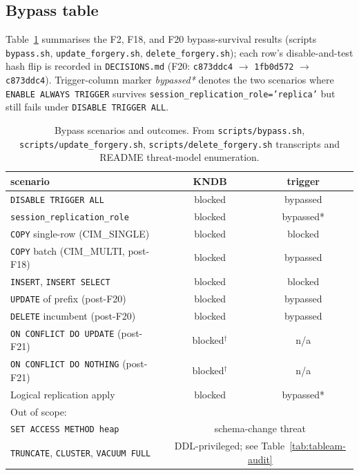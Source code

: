 \documentclass[sigconf, nonacm]{acmart}
\begin{document}
\subsection{Bypass table}
Table~\ref{tab:bypass} summarises the F2, F18, and F20 bypass-survival results (scripts \texttt{bypass.sh}, \texttt{update\_forgery.sh}, \texttt{delete\_forgery.sh}); each row's disable-and-test hash flip is recorded in \texttt{DECISIONS.md} (F20: \texttt{c873ddc4} $\to$ \texttt{1fb0d572} $\to$ \texttt{c873ddc4}). Trigger-column marker \emph{bypassed*} denotes the two scenarios where \texttt{ENABLE ALWAYS TRIGGER} survives \texttt{session\_replication\_role='replica'} but still fails under \texttt{DISABLE TRIGGER ALL}.

\begin{table}[t]
\centering
\caption{Bypass scenarios and outcomes. From \texttt{scripts/bypass.sh}, \texttt{scripts/update\_forgery.sh}, \texttt{scripts/delete\_forgery.sh} transcripts and README threat-model enumeration.}
\label{tab:bypass}
\small
\begin{tabular}{p{4.7cm}cc}
\toprule
scenario & KNDB & trigger \\
\midrule
\texttt{DISABLE TRIGGER ALL}                & blocked & bypassed \\
\texttt{session\_replication\_role}         & blocked & bypassed* \\
\texttt{COPY} single-row (CIM\_SINGLE)      & blocked & blocked \\
\texttt{COPY} batch (CIM\_MULTI, post-F18)  & blocked & bypassed \\
\texttt{INSERT}, \texttt{INSERT SELECT}     & blocked & blocked \\
\texttt{UPDATE} of prefix (post-F20)        & blocked & bypassed \\
\texttt{DELETE} incumbent (post-F20)        & blocked & bypassed \\
\texttt{ON CONFLICT DO UPDATE} (post-F21)   & blocked$^{\dagger}$ & n/a \\
\texttt{ON CONFLICT DO NOTHING} (post-F21)  & blocked$^{\dagger}$ & n/a \\
Logical replication apply                   & blocked & bypassed* \\
\midrule
\multicolumn{3}{l}{Out of scope:} \\
\texttt{SET ACCESS METHOD heap}             & \multicolumn{2}{c}{schema-change threat} \\
\texttt{TRUNCATE}, \texttt{CLUSTER}, \texttt{VACUUM FULL} & \multicolumn{2}{c}{DDL-privileged; see Table~\ref{tab:tableam-audit}} \\

\end{tabular}
\end{table}
\end{document}
